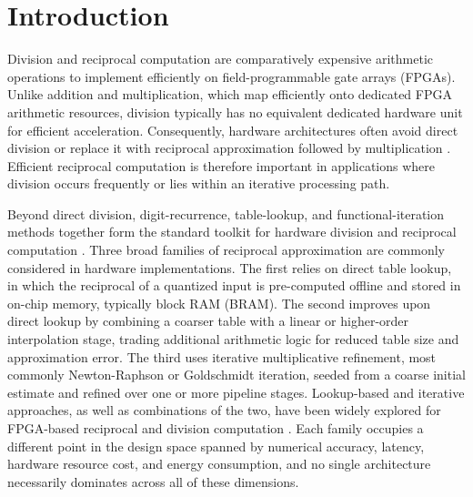 \documentclass[manuscript,screen,review]{acmart}
\begin{document}



\maketitle

\section{Introduction}
\label{sec:intro}

Division and reciprocal computation are comparatively expensive arithmetic operations to implement efficiently on field-programmable gate arrays (FPGAs). Unlike addition and multiplication, which map efficiently onto dedicated FPGA arithmetic resources, division typically has no equivalent dedicated hardware unit for efficient acceleration. Consequently, hardware architectures often avoid direct division or replace it with reciprocal approximation followed by multiplication \cite{Oberman97}. Efficient reciprocal computation is therefore important in applications where division occurs frequently or lies within an iterative processing path.

Beyond direct division, digit-recurrence, table-lookup, and functional-iteration methods together form the standard toolkit for hardware division and reciprocal computation \cite{ErcegovacLang04}. Three broad families of reciprocal approximation are commonly considered in hardware implementations. The first relies on direct table lookup, in which the reciprocal of a quantized input is pre-computed offline and stored in on-chip memory, typically block RAM (BRAM). The second improves upon direct lookup by combining a coarser table with a linear or higher-order interpolation stage, trading additional arithmetic logic for reduced table size and approximation error. The third uses iterative multiplicative refinement, most commonly Newton-Raphson or Goldschmidt iteration, seeded from a coarse initial estimate and refined over one or more pipeline stages. Lookup-based and iterative approaches, as well as combinations of the two, have been widely explored for FPGA-based reciprocal and division computation \cite{Oberman97}. Each family occupies a different point in the design space spanned by numerical accuracy, latency, hardware resource cost, and energy consumption, and no single architecture necessarily dominates across all of these dimensions.
\end{document}
